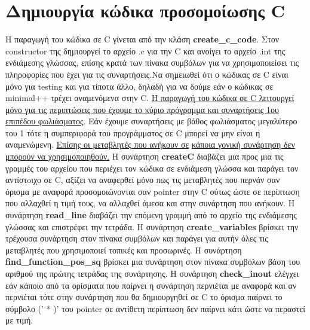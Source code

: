 \documentclass[12pt,a4paper,a4paper]{report}
\begin{document}
\chapter{Δημιουργία κώδικα προσομοίωσης C}
Η παραγωγή του κώδικα σε C γίνεται από την κλάση \textbf{create\_c\_code}. Στον constructor της δημιουργεί το αρχείο .c για την C και ανοίγει το αρχείο .int της ενδιάμεσης γλώσσας, επίσης κρατά των πίνακα συμβόλων για να χρησιμοποιείσει τις πληροφορίες που έχει για τις συναρτήσεις.Να σημειωθεί ότι ο κώδικας σε C είναι μόνο για testing και για τίποτα άλλο, δηλαδή για να δούμε εάν ο κώδικας σε minimal++ τρέχει αναμενόμενα στην C.  \underline{Η παραγωγή του κώδικα σε C λειτουργεί μόνο για τις} \newline \underline{περιπτώσεις που έχουμε το κύριο πρόγραμμα και συναρτήσεις 1ου } \newline \underline{επιπέδου φωλιάσματος}. Εάν έχουμε συναρτήσεις με βάθος φωλιάσματος μεγαλύτερο του 1 τότε η συμπεριφορά του προγράμματος σε C μπορεί να μην είναι η αναμενώμενη. \underline{Επίσης οι μεταβλητές που ανήκουν σε} \underline{κάποια γονική συνάρτηση δεν μπορούν να χρησιμοποιηθούν.} H συνάρτηση \textbf{createC} διαβάζει μια προς μια τις γραμμές του αρχείου που περιέχει τον κώδικα σε ενδιάμεση γλώσσα και παράγει τον αντίστoιχο σε C, αξίζει να αναφερθεί μόνο πως τις μεταβλητές που περνάν σαν όρισμα με αναφορά προσομοιώνονται σαν pointer στην C ούτως ώστε σε περίπτωση που αλλαχθεί η τιμή τους, να αλλαχθεί άμεσα και στην συνάρτηση που ανήκουν. Η συνάρτηση \textbf{read\_line} διαβάζει την επόμενη γραμμή από το αρχείο της ενδιάμεσης γλώσσας και επιστρέφει την τετράδα. Η συνάρτηση \textbf{create\_variables} βρίσκει την τρέχουσα συνάρτηση στον πίνακα συμβόλων και παράγει για αυτήν όλες τις μεταβλητές που χρησιμοποιεί τοπικές και προσωρινές. Η συνάρτηση \textbf{find\_function\_pos\_sq} βρίσκει μια συνάρτηση στον πίνακα συμβόλων βάση του αριθμού της πρώτης τετράδας της συνάρτησης. Η συνάρτηση \textbf{check\_inout} ελέγχει εάν κάποιο από τα ορίσματα που παίρνει η συνάρτηση περνιέται με αναφορά και αν περνιέται τότε στην συνάρτηση που θα δημιουργηθεί σε C το όρισμα παίρνει το σύμβολο (' * )' του pointer σε αντίθετη περίπτωση δεν παίρνει κάτι ώστε να περαστεί με τιμή.\\
\end{document}
